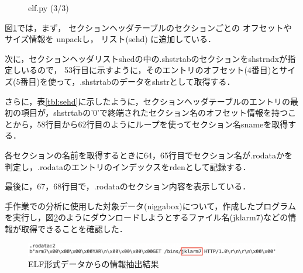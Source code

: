 \documentclass[dvipdfmx]{bta}
\begin{document}
\begin{figure}[htbp]
	
	\caption{elf.py (3/3)}\label{fig:elf03.py}
\end{figure}	

図\ref{fig:elf03.py}では，まず，
セクションヘッダテーブルのセクションごとの
オフセットやサイズ情報を
unpackし，
リスト(sehd)
に追加している．

次に，セクションヘッダリストshedの中の.shstrtabのセクションをshstrndxが指定しいるので，
53行目に示すように，そのエントリのオフセット(4番目)とサイズ(5番目)を使って，.shstrtabのデータをshstrとして取得する．

さらに，表\ref{tbl:sehd}に示したように，セクションヘッダテーブルのエントリの最初の項目が，shstrtabの'0'で終端されたセクション名のオフセット情報を持つことから，58行目から62行目のようにループを使ってセクション名snameを取得する．

各セクションの名前を取得するときに64，65行目でセクション名が.rodataかを判定し，.rodataのエントリのインデックスをrdenとして記録する．

最後に，67，68行目で，.rodataのセクション内容を表示している．





手作業での分析に使用した対象データ(niggabox)について，作成したプログラムを実行し，図\ref{fig:jklarm7}のようにダウンロードしようとするファイル名(jklarm7)などの情報が取得できることを確認した．


\begin{figure}[htbp]
	\centering
 	\includegraphics[scale = 0.6]
	{jklarm7.png}
 	\caption{ELF形式データからの情報抽出結果}\label{fig:jklarm7}
\end{figure}
\end{document}
